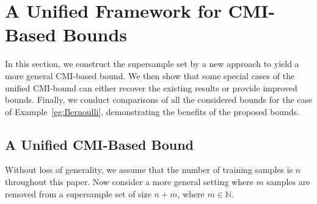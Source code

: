 \documentclass[onecolumn,romanappendices,10pt]{IEEEtran}
\newcommand{\NN}{{\mathbb{N}}}
\begin{document}
	\section{A Unified Framework for CMI-Based Bounds}\label{sec:unified-CMI}
	In this section, we construct the supersample set by a new approach to yield a more general CMI-based bound. We then show that some special cases of the unified CMI-bound can either recover the existing results or provide improved bounds. Finally, we conduct comparisons of all the considered bounds for the case of Example~\ref{eg:Bernoulli}, demonstrating the benefits of the proposed bounds.
	
	\subsection{A Unified CMI-Based Bound}
	Without loss of generality, we assume that the number of training samples is $n$ throughout this paper. Now consider a more general setting where $m$ samples are removed from a supersample set of size $n+m$, where $m \in \NN$. 
	
\end{document}
